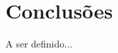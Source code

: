 \documentclass[11pt,twoside,a4paper]{book}
\renewcommand{\chaptermark}[1]{\markboth{\MakeUppercase{#1}}{}}
\begin{document}
\chapter{Conclusões}
\label{chap:conclusoes}
A ser definido...

\renewcommand{\chaptermark}[1]{\markboth{\MakeUppercase{\appendixname\ \thechapter}} {\MakeUppercase{#1}} }
\fancyhead[RE,LO]{}
\appendix

% 

\backmatter \singlespacing   %

\end{document}
